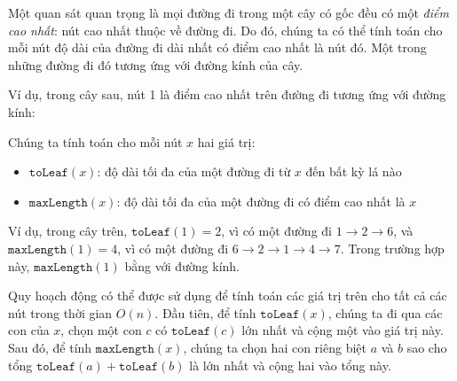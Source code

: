 Một quan sát quan trọng là mọi đường đi
trong một cây có gốc đều có một \emph{điểm cao nhất}:
nút cao nhất thuộc về đường đi.
Do đó, chúng ta có thể tính toán cho mỗi nút độ dài
của đường đi dài nhất có điểm cao nhất là nút đó.
Một trong những đường đi đó tương ứng với đường kính của cây.

Ví dụ, trong cây sau,
nút 1 là điểm cao nhất trên đường đi
tương ứng với đường kính:
\begin{center}
\end{center}

Chúng ta tính toán cho mỗi nút $x$ hai giá trị:
\begin{itemize}
\item $\texttt{toLeaf}(x)$: độ dài tối đa của một đường đi từ $x$ đến bất kỳ lá nào
\item $\texttt{maxLength}(x)$: độ dài tối đa của một đường đi
có điểm cao nhất là $x$
\end{itemize}
Ví dụ, trong cây trên,
$\texttt{toLeaf}(1)=2$, vì có một đường đi
$1 \rightarrow 2 \rightarrow 6$,
và $\texttt{maxLength}(1)=4$,
vì có một đường đi
$6 \rightarrow 2 \rightarrow 1 \rightarrow 4 \rightarrow 7$.
Trong trường hợp này, $\texttt{maxLength}(1)$ bằng với đường kính.

Quy hoạch động có thể được sử dụng để tính toán các giá trị trên
cho tất cả các nút trong thời gian $O(n)$.
Đầu tiên, để tính $\texttt{toLeaf}(x)$,
chúng ta đi qua các con của $x$,
chọn một con $c$ có $\texttt{toLeaf}(c)$ lớn nhất
và cộng một vào giá trị này.
Sau đó, để tính $\texttt{maxLength}(x)$,
chúng ta chọn hai con riêng biệt $a$ và $b$
sao cho tổng $\texttt{toLeaf}(a)+\texttt{toLeaf}(b)$
là lớn nhất và cộng hai vào tổng này.


